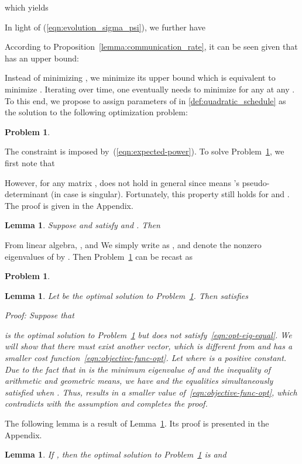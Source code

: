 \documentclass[twocolumn]{autart}    \usepackage{cite}
\newtheorem{lemma}[theorem]{Lemma}
\newtheorem{problem}[theorem]{Problem}
\begin{document}
{{which yields

In light of
(\ref{eqn:evolution_sigma_psi}),
we further have

According to Proposition~\ref{lemma:communication_rate},
it can be seen given  that  has an
upper bound:

Instead of minimizing ,
we minimize its upper bound which is equivalent to
minimize . Iterating
over time, one eventually needs to minimize  for
any  at any .
To this end, we propose to assign parameters of  in
\eqref{def:quadratic_schedule} as the solution to the following
optimization problem:
\begin{problem}\label{problem:optimization_online}
  
\end{problem}
The constraint is imposed by~(\ref{eqn:expected-power}). To solve Problem~\ref{problem:optimization_online}, we
first note that

However, for any matrix ,
 does not hold in general since  means 's
pseudo-determinant (in case  is singular). Fortunately, this property still holds for  and .
The proof is given in the Appendix.
\begin{lemma}\label{lemma:det-transform}
Suppose  and 
satisfy  and
.
Then 
\end{lemma}
From linear algebra,
,
and 
We simply write
 as ,
and denote the nonzero
eigenvalues of  by
. Then
Problem~\ref{problem:optimization_online}
can be recast as
\begin{problem}\label{problem:transform_optimization_online}
      
\end{problem}
\begin{lemma}\label{lemma:equal-eig}
Let  be the optimal solution to Problem~\ref{problem:transform_optimization_online}.
Then  satisfies

\begin{pf*}{Proof:}
Suppose that

is the optimal solution to
Problem~\ref{problem:transform_optimization_online}
but does not satisfy~\eqref{eqn:opt-eig-equal}.
We will show that there must exist another
vector, which is different from  and has
a smaller cost function~\eqref{eqn:objective-func-opt}.
Let  where
 is a positive constant.
Due to the fact that
 in  is the minimum eigenvalue of
 and the inequality of arithmetic
and geometric means, we have
 and 
the equalities simultaneously
satisfied when . Thus,  results in a smaller value
of~\eqref{eqn:objective-func-opt}, which
contradicts with the assumption and
completes the proof.
\end{pf*}
\end{lemma}
The following lemma is a result of Lemma~\ref{lemma:equal-eig}. Its proof is
presented in the Appendix.
\begin{lemma}\label{thm:opt-sol}
If , then the optimal
solution to Problem~\ref{problem:transform_optimization_online}
is  and


\end{lemma}}}
\end{document}
